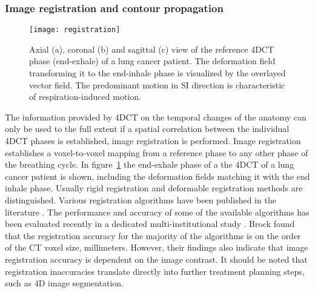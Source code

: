 \subsubsection{Image registration and contour propagation}
%
%  
\begin{figure}[tbp]
  \centering
  \texttt{[image: registration]}
  \caption[\acl{4DCT} and image registration]{Axial (a), coronal (b)
    and sagittal (c) view of the reference \ac{4DCT} phase (end-exhale)
    of a lung cancer patient. The deformation field transforming it to
    the end-inhale phase is visualized by the overlayed vector
    field. The predominant motion in \ac{SI} direction is
    characteristic of respiration-induced motion.}
  \label{fig:background:registration}
\end{figure}

The information provided by \ac{4DCT} on the temporal changes of the
anatomy can only be used to the full extent if a spatial correlation
between the individual \ac{4DCT} phases is established, \ie image
registration is performed. Image registration establishes a
voxel-to-voxel mapping from a reference phase to any other phase of
the breathing cycle. In figure~\ref{fig:background:registration} the
end-exhale phase of a the \ac{4DCT} of a lung cancer patient is shown,
including the deformation fields matching it with the end inhale
phase. Usually rigid registration and deformable registration methods
are distinguished. Various registration algorithms have been published
in the literature \citep{Hill2001,Brock2006,Rietzel2006a}. The
performance and accuracy of some of the available algorithms has been
evaluated recently in a dedicated multi-institutional study
\citep{Brock2010}. Brock \etal found that the registration accuracy
for the majority of the algorithms is on the order of the \ac{CT}
voxel size, \ie millimeters. However, their findings also indicate
that image registration accuracy is dependent on the image contrast.
It should be noted that registration inaccuracies translate directly
into further treatment planning steps, such as \ac{4D} image
segmentation.

